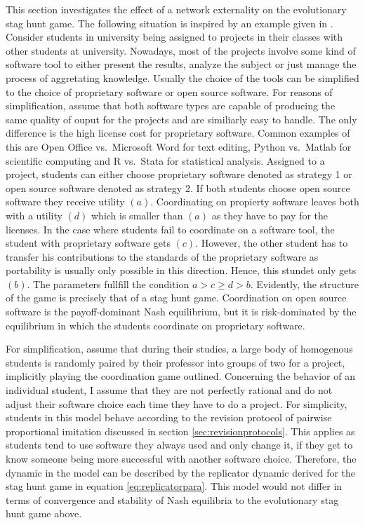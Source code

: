 \label{sec:simplemodel}
This section investigates the effect of a network externality on the
evolutionary stag hunt game. The following situation is inspired by an
example given in \textcite{kandori_learning_1993}. 
Consider students in university being assigned to
projects in their classes with other students at university. 
Nowadays, most of the projects involve some kind of software tool to either 
present the results, analyze the subject or just manage the process of aggretating 
knowledge. Usually the choice of the tools can be simplified to 
the choice of proprietary software or open source software. 
For reasons of simplification, assume that both 
software types are capable of producing
the same quality of ouput for the projects and are similiarly easy to handle.
The only difference is the high license cost for proprietary software.
Common examples of this are Open Office vs.\ Microsoft Word for text editing,
Python vs.\ Matlab for scientific computing and R vs.\ Stata for statistical
analysis. Assigned to a project, students can either choose proprietary
software denoted as strategy 1 or open source software denoted as strategy 2.
If both students choose open source software they receive utility $(a)$.
Coordinating on propierty software leaves both with a utility $(d)$ which is
smaller than $(a)$ as they have to pay for the licenses. In the case 
where students fail to coordinate on a software tool, the student
with proprietary software gets $(c)$. However, the other student
has to transfer his contributions to the standards of the proprietary software
as portability is usually only possible in this direction.
Hence, this stundet only gets $(b)$. The parameters fullfill 
the condition $a > c \geq d >b$.
Evidently, the structure of the game is precisely that of a stag hunt game. 
Coordination on open source software is the payoff-dominant Nash equilibrium,
but it is risk-dominated by the equilibrium in which the students 
coordinate on proprietary software. 

For simplification, assume that during their studies, a large body of 
homogenous students is randomly paired by their professor into groups of two 
for a project, implicitly playing the coordination game outlined. 
Concerning the behavior of an individual student, I assume that they are 
not perfectly rational and do not adjust their software choice 
each time they have to do a project.
For simplicity, students in this model behave according to the 
revision protocol of pairwise proportional imitation discussed in section 
\ref{sec:revisionprotocols}. 
This applies as students tend to use software they always used and 
only change it, if they get to know someone being more successful with
another software choice. Therefore, the dynamic in the model can be 
described by the replicator dynamic derived for the stag hunt game in 
equation \eqref{eq:replicatorpara}.
This model would not differ in terms of convergence and stability of Nash 
equilibria to the evolutionary stag hunt game above.

